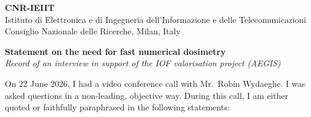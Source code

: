 \documentclass[11pt]{article}
\begin{document}
{\large\textbf{CNR-IEIIT}}\\
Istituto di Elettronica e di Ingegneria dell'Informazione e delle Telecomunicazioni\\
Consiglio Nazionale delle Ricerche, Milan, Italy\\[1.5em]

\begin{center}
\textbf{\large Statement on the need for fast numerical dosimetry}\\[0.3em]
\textit{Record of an interview in support of the IOF valorisation project (AEGIS)}
\end{center}

\bigskip
On 22 June 2026, I had a video conference call with Mr.\ Robin Wydaeghe. I was asked
questions in a non-leading, objective way. During this call, I am either quoted or faithfully
paraphrased in the following statements:
\end{document}
